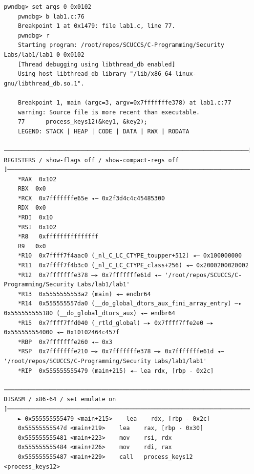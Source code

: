 \documentclass[a4pper,12pt,onecolumn]{article}
\begin{document}
\begin{lstlisting}[style=DOS]
    pwndbg> set args 0 0x0102
    pwndbg> b lab1.c:76
    Breakpoint 1 at 0x1479: file lab1.c, line 77.
    pwndbg> r
    Starting program: /root/repos/SCUCCS/C-Programming/Security Labs/lab1/lab1 0 0x0102
    [Thread debugging using libthread_db enabled]
    Using host libthread_db library "/lib/x86_64-linux-gnu/libthread_db.so.1".

    Breakpoint 1, main (argc=3, argv=0x7fffffffe378) at lab1.c:77
    warning: Source file is more recent than executable.
    77	    process_keys12(&key1, &key2);
    LEGEND: STACK | HEAP | CODE | DATA | RWX | RODATA
    ──────────────────────────────────────────────────────────────────────[ REGISTERS / show-flags off / show-compact-regs off ]───────────────────────────────────────────────────────────────────────
    *RAX  0x102
    RBX  0x0
    *RCX  0x7fffffffe65e ◂— 0x2f3d4c4c45485300
    RDX  0x0
    *RDI  0x10
    *RSI  0x102
    *R8   0xfffffffffffffff
    R9   0x0
    *R10  0x7ffff7f4aac0 (_nl_C_LC_CTYPE_toupper+512) ◂— 0x100000000
    *R11  0x7ffff7f4b3c0 (_nl_C_LC_CTYPE_class+256) ◂— 0x2000200020002
    *R12  0x7fffffffe378 —▸ 0x7fffffffe61d ◂— '/root/repos/SCUCCS/C-Programming/Security Labs/lab1/lab1'
    *R13  0x5555555553a2 (main) ◂— endbr64 
    *R14  0x555555557da0 (__do_global_dtors_aux_fini_array_entry) —▸ 0x555555555180 (__do_global_dtors_aux) ◂— endbr64 
    *R15  0x7ffff7ffd040 (_rtld_global) —▸ 0x7ffff7ffe2e0 —▸ 0x555555554000 ◂— 0x10102464c457f
    *RBP  0x7fffffffe260 ◂— 0x3
    *RSP  0x7fffffffe210 —▸ 0x7fffffffe378 —▸ 0x7fffffffe61d ◂— '/root/repos/SCUCCS/C-Programming/Security Labs/lab1/lab1'
    *RIP  0x555555555479 (main+215) ◂— lea rdx, [rbp - 0x2c]
    ───────────────────────────────────────────────────────────────────────────────[ DISASM / x86-64 / set emulate on ]────────────────────────────────────────────────────────────────────────────────
    ► 0x555555555479 <main+215>    lea    rdx, [rbp - 0x2c]
    0x55555555547d <main+219>    lea    rax, [rbp - 0x30]
    0x555555555481 <main+223>    mov    rsi, rdx
    0x555555555484 <main+226>    mov    rdi, rax
    0x555555555487 <main+229>    call   process_keys12                <process_keys12>
    

\end{lstlisting}
\end{document}
